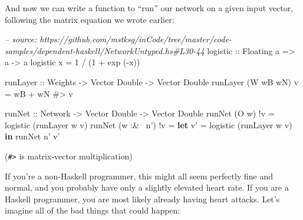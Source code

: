 \documentclass[]{article}
\newenvironment{Shaded}{}{}
\newcommand{\KeywordTok}[1]{\textcolor[rgb]{0.00,0.44,0.13}{\textbf{{#1}}}}
\newcommand{\DataTypeTok}[1]{\textcolor[rgb]{0.56,0.13,0.00}{{#1}}}
\newcommand{\DecValTok}[1]{\textcolor[rgb]{0.25,0.63,0.44}{{#1}}}
\newcommand{\CommentTok}[1]{\textcolor[rgb]{0.38,0.63,0.69}{\textit{{#1}}}}
\newcommand{\OtherTok}[1]{\textcolor[rgb]{0.00,0.44,0.13}{{#1}}}
\newcommand{\FunctionTok}[1]{\textcolor[rgb]{0.02,0.16,0.49}{{#1}}}
\newcommand{\NormalTok}[1]{{#1}}
\begin{document}
And now we can write a function to ``run'' our network on a given input
vector, following the matrix equation we wrote earlier:

\begin{Shaded}
\begin{Highlighting}[]
\CommentTok{-- source: https://github.com/mstksg/inCode/tree/master/code-samples/dependent-haskell/NetworkUntyped.hs#L30-44}
\OtherTok{logistic ::} \DataTypeTok{Floating} \NormalTok{a }\OtherTok{=>} \NormalTok{a }\OtherTok{->} \NormalTok{a}
\NormalTok{logistic x }\FunctionTok{=} \DecValTok{1} \FunctionTok{/} \NormalTok{(}\DecValTok{1} \FunctionTok{+} \NormalTok{exp (}\FunctionTok{-}\NormalTok{x))}

\OtherTok{runLayer ::} \DataTypeTok{Weights} \OtherTok{->} \DataTypeTok{Vector} \DataTypeTok{Double} \OtherTok{->} \DataTypeTok{Vector} \DataTypeTok{Double}
\NormalTok{runLayer (}\DataTypeTok{W} \NormalTok{wB wN) v }\FunctionTok{=} \NormalTok{wB }\FunctionTok{+} \NormalTok{wN }\FunctionTok{#>} \NormalTok{v}

\OtherTok{runNet ::} \DataTypeTok{Network} \OtherTok{->} \DataTypeTok{Vector} \DataTypeTok{Double} \OtherTok{->} \DataTypeTok{Vector} \DataTypeTok{Double}
\NormalTok{runNet (}\DataTypeTok{O} \NormalTok{w)      }\FunctionTok{!}\NormalTok{v }\FunctionTok{=} \NormalTok{logistic (runLayer w v)}
\NormalTok{runNet (w }\FunctionTok{:&~} \NormalTok{n') }\FunctionTok{!}\NormalTok{v }\FunctionTok{=} \KeywordTok{let} \NormalTok{v' }\FunctionTok{=} \NormalTok{logistic (runLayer w v)}
                       \KeywordTok{in}  \NormalTok{runNet n' v'}
\end{Highlighting}
\end{Shaded}

(\texttt{\#\textgreater{}} is matrix-vector multiplication)

If you're a non-Haskell programmer, this might all seem perfectly fine
and normal, and you probably have only a slightly elevated heart rate.
If you are a Haskell programmer, you are most likely already having
heart attacks. Let's imagine all of the bad things that could happen:
\end{document}
